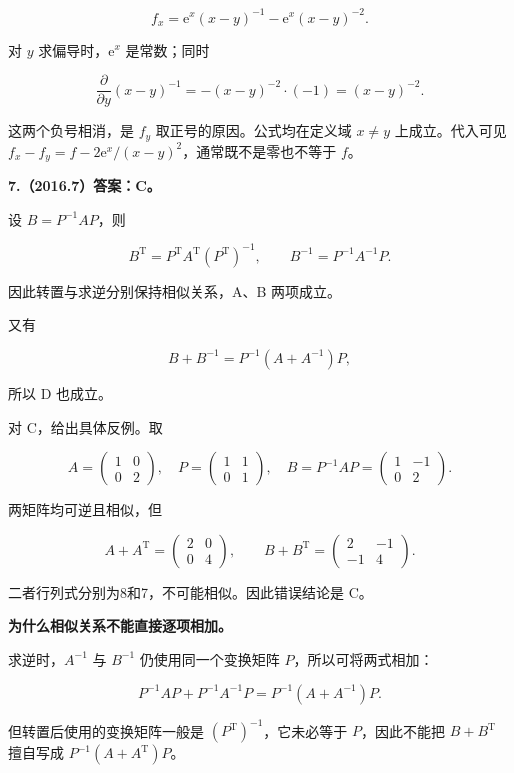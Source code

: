 \documentclass[UTF8,11pt,fontset=windows]{ctexart}
\begin{document}
$$
f_x=\mathrm e^x(x-y)^{-1}-\mathrm e^x(x-y)^{-2}.
$$

对 $y$ 求偏导时，$\mathrm e^x$ 是常数；同时

$$
\frac{\partial}{\partial y}(x-y)^{-1}
=-(x-y)^{-2}\cdot(-1)=(x-y)^{-2}.
$$

这两个负号相消，是 $f_y$ 取正号的原因。公式均在定义域 $x\ne y$ 上成立。代入可见 $f_x-f_y=f-2\mathrm e^x/(x-y)^2$，通常既不是零也不等于 $f$。

\clearpage

\textbf{7.（2016.7）答案：C。}

设 $B=P^{-1}AP$，则

$$
B^{\mathrm T}=P^{\mathrm T}A^{\mathrm T}(P^{\mathrm T})^{-1},
\qquad B^{-1}=P^{-1}A^{-1}P.
$$

因此转置与求逆分别保持相似关系，A、B 两项成立。

又有

$$
B+B^{-1}=P^{-1}(A+A^{-1})P,
$$

所以 D 也成立。

对 C，给出具体反例。取

$$
A=\begin{pmatrix}1&0\\0&2\end{pmatrix},\quad
P=\begin{pmatrix}1&1\\0&1\end{pmatrix},\quad
B=P^{-1}AP=\begin{pmatrix}1&-1\\0&2\end{pmatrix}.
$$

两矩阵均可逆且相似，但

$$
A+A^{\mathrm T}=\begin{pmatrix}2&0\\0&4\end{pmatrix},\qquad
B+B^{\mathrm T}=\begin{pmatrix}2&-1\\-1&4\end{pmatrix}.
$$

二者行列式分别为8和7，不可能相似。因此错误结论是 C。

\textbf{为什么相似关系不能直接逐项相加。}

求逆时，$A^{-1}$ 与 $B^{-1}$ 仍使用同一个变换矩阵 $P$，所以可将两式相加：

$$
P^{-1}AP+P^{-1}A^{-1}P=P^{-1}(A+A^{-1})P.
$$

但转置后使用的变换矩阵一般是 $(P^{\mathrm T})^{-1}$，它未必等于 $P$，因此不能把 $B+B^{\mathrm T}$ 擅自写成 $P^{-1}(A+A^{\mathrm T})P$。
\end{document}

